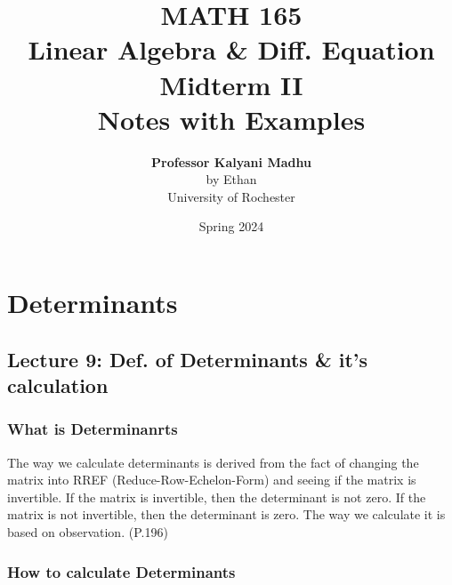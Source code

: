 \documentclass[oneside]{book}
\def\notetitle{MATH 165\\Linear Algebra \& Diff. Equation\\Midterm II \\Notes with Examples}
\def\noteauthor{
    \textbf{Professor Kalyani Madhu} \\ 
    by Ethan\\
    University of Rochester}
\def\notedate{Spring 2024}
\begin{document}
\title{\textbf{
    \LARGE{\notetitle} \vspace*{10\baselineskip}}
    }
\author{\noteauthor}
\date{\notedate}

\maketitle
\newpage

\tableofcontents
\newpage



\chapter{Determinants}
\section{Lecture 9: Def. of Determinants \& it's calculation}


\subsection{What is Determinanrts}

The way we calculate determinants is derived from the fact of changing the matrix into RREF (Reduce-Row-Echelon-Form) and seeing if the matrix is invertible. If the matrix is invertible, then the determinant is not zero. If the matrix is not invertible, then the determinant is zero. The way we calculate it is based on observation. (P.196)

\subsection{How to calculate Determinants}
\end{document}
